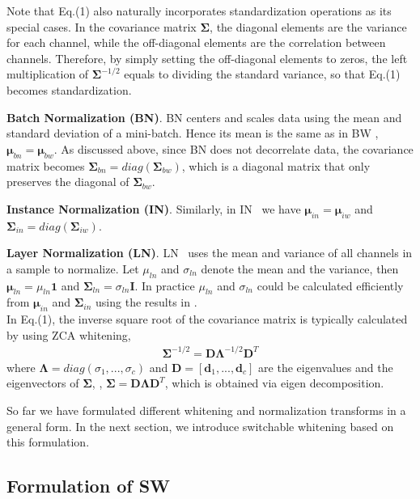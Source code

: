 \documentclass[10pt,twocolumn,letterpaper]{article}
\begin{document}
Note that Eq.(1) also naturally incorporates standardization operations as its special cases.
In the covariance matrix \(\bm{\Sigma}\), the diagonal elements are the variance for each channel, while the off-diagonal elements are the correlation between channels.
Therefore, by simply setting the off-diagonal elements to zeros, the left multiplication of \(\bm{\Sigma}^{-1/2}\) equals to dividing the standard variance, so that Eq.(1) becomes standardization.

\textbf{Batch Normalization (BN)}.
BN\cite{ioffe2015batch} centers and scales data using the mean and standard deviation of a mini-batch.
Hence its mean is the same as in BW \ie, \(\bm{\mu}_{bn} = \bm{\mu}_{bw}\).
As discussed above, since BN does not decorrelate data, the covariance matrix becomes \(\bm{\Sigma}_{bn} = diag(\bm{\Sigma}_{bw})\), which is a diagonal matrix that only preserves the diagonal of \(\bm{\Sigma}_{bw}\).

\textbf{Instance Normalization (IN)}.
Similarly, in IN~\cite{ulyanov2017improved} we have \(\bm{\mu}_{in} = \bm{\mu}_{iw}\) and \(\bm{\Sigma}_{in} = diag(\bm{\Sigma}_{iw})\).

\textbf{Layer Normalization (LN)}.
LN~\cite{ba2016layer} uses the mean and variance of all channels in a sample to normalize.
Let \(\mu_{ln}\) and \(\sigma_{ln}\) denote the mean and the variance, 
then \(\bm{\mu}_{ln} = \mu_{ln} \mathbf{1} \) and \(\bm{\Sigma}_{ln} = \sigma_{ln} \mathbf{I} \).
In practice \(\mu_{ln}\) and \(\sigma_{ln}\) could be calculated efficiently from $\bm{\mu}_{in}$ and $\bm{\Sigma}_{in}$ using the results in \cite{luo2018differentiable}.
~\\



In Eq.(1), the inverse square root of the covariance matrix is typically calculated by using ZCA whitening,
\begin{align}
\bm{\Sigma}^{-1/2} = \mathbf{D} \bm{\Lambda}^{-1/2} \mathbf{D}^{T}
\end{align}
where \(\bm{\Lambda} = diag(\sigma_1, ..., \sigma_c)\) and \(\mathbf{D} = [\bm{d}_1, ..., \bm{d}_c]\) are the eigenvalues and the eigenvectors of \(\bm{\Sigma}\), \ie, \(\bm{\Sigma} = \mathbf{D} \bm{\Lambda} \mathbf{D}^{T} \), which is obtained via eigen decomposition.

So far we have formulated different whitening and normalization transforms in a general form.
In the next section, we introduce switchable whitening based on this formulation.

\subsection{Formulation of SW}
\end{document}
